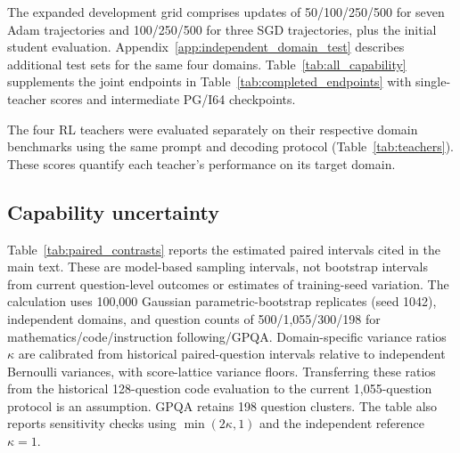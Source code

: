 The expanded development grid comprises updates of 50/100/250/500 for seven Adam trajectories and 100/250/500 for three SGD trajectories, plus the initial student evaluation. Appendix~\ref{app:independent_domain_test} describes additional test sets for the same four domains. Table~\ref{tab:all_capability} supplements the joint endpoints in Table~\ref{tab:completed_endpoints} with single-teacher scores and intermediate PG/I64 checkpoints.

\begin{table}[t]
\caption{\textbf{PG/I64 performance depends on the task and checkpoint.} Mean scores (\%): S is mathematics-only training and M is joint training; both use DR. Joint endpoints appear in Table~\ref{tab:completed_endpoints}.}
\label{tab:all_capability}
\centering\small

\end{table}

The four RL teachers were evaluated separately on their respective domain benchmarks using the same prompt and decoding protocol (Table~\ref{tab:teachers}). These scores quantify each teacher's performance on its target domain.

\begin{table}[t]
\caption{\textbf{Reference scores for the four domain-specific teachers} (\%). Science uses GPQA average@4.}
\label{tab:teachers}
\centering\small

\end{table}

\subsection{Capability uncertainty}
\label{app:capability_uncertainty}

Table~\ref{tab:paired_contrasts} reports the estimated paired intervals cited in the main text. These are model-based sampling intervals, not bootstrap intervals from current question-level outcomes or estimates of training-seed variation. The calculation uses 100,000 Gaussian parametric-bootstrap replicates (seed 1042), independent domains, and question counts of 500/1,055/300/198 for mathematics/code/instruction following/GPQA. Domain-specific variance ratios $\kappa$ are calibrated from historical paired-question intervals relative to independent Bernoulli variances, with score-lattice variance floors. Transferring these ratios from the historical 128-question code evaluation to the current 1,055-question protocol is an assumption. GPQA retains 198 question clusters. The table also reports sensitivity checks using $\min(2\kappa,1)$ and the independent reference $\kappa=1$.


